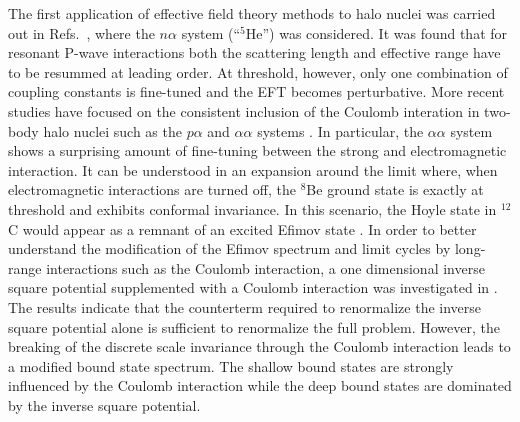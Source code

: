 \documentclass[aps,rmp,nofootinbib,twocolumn,floatfix]{revtex4}
\begin{document}
The first application of effective field theory methods to halo nuclei 
was carried out in Refs.~\cite{Bertulani:2002sz,Bedaque:2003wa}, where the 
$n\alpha$ system (``$^5$He'') was considered. It was found that 
for resonant P-wave interactions both the scattering length and effective 
range have to be resummed at leading order. At threshold, however, only 
one combination of coupling constants is fine-tuned and the EFT becomes
perturbative. More recent studies have 
focused on the consistent inclusion of the Coulomb interation in two-body 
halo nuclei such as the $p\alpha$ and $\alpha\alpha$ 
systems \cite{Higa:2008rx,Higa:2008dn}. 
In particular, the $\alpha\alpha$ system shows
a surprising amount of fine-tuning between the strong and electromagnetic
interaction. It can be understood in an expansion 
around the limit where, when electromagnetic interactions are turned off, 
the $^8$Be ground state is exactly at threshold and exhibits conformal 
invariance. In this scenario, the Hoyle state in $^{12}$C would appear
as a remnant of an excited Efimov state \cite{Efimov:1981aa}.
In order to better understand the modification of the Efimov spectrum
and limit cycles by long-range interactions such as the Coulomb interaction, 
a one dimensional inverse square potential supplemented with a 
Coulomb interaction was investigated in \cite{Hammer:2008ra}.
The results indicate that the counterterm required to renormalize the 
inverse square potential alone is sufficient to renormalize the full 
problem. However, the breaking of the discrete scale invariance through 
the Coulomb interaction leads to a modified bound state spectrum. The 
shallow bound states are strongly influenced by the Coulomb interaction 
while the deep bound states are dominated by the inverse square potential.
\end{document}
